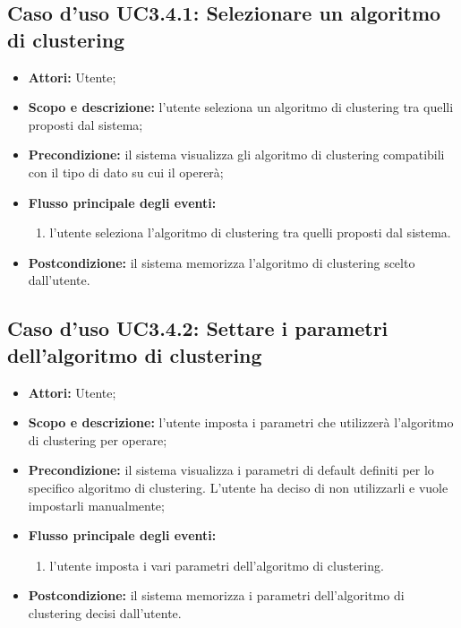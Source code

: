 \subsection{Caso d'uso UC3.4.1: Selezionare un algoritmo di clustering}
\begin{itemize}
\item \textbf{Attori:} Utente;
\item \textbf{Scopo e descrizione:} l'utente seleziona un algoritmo di clustering\glossario{} tra quelli proposti dal sistema;
\item \textbf{Precondizione:} il sistema visualizza gli algoritmo di clustering\glossario{} compatibili con il tipo di dato su cui il \protocol{} opererà;
\item \textbf{Flusso principale degli eventi:}
\begin{enumerate}
\item l'utente seleziona l'algoritmo di clustering\glossario{} tra quelli proposti dal sistema.
\end{enumerate}
\item \textbf{Postcondizione:} il sistema memorizza l'algoritmo di clustering\glossario{} scelto dall'utente.
\end{itemize}

\subsection{Caso d'uso UC3.4.2: Settare i parametri dell'algoritmo di clustering}
\begin{itemize}
\item \textbf{Attori:} Utente;
\item \textbf{Scopo e descrizione:} l'utente imposta i parametri che utilizzerà l'algoritmo di clustering\glossario{} per operare;
\item \textbf{Precondizione:} il sistema visualizza i parametri di default definiti per lo specifico algoritmo di clustering\glossario{}. L'utente ha deciso di non utilizzarli e vuole impostarli manualmente;
\item \textbf{Flusso principale degli eventi:}
\begin{enumerate}
\item l'utente imposta i vari parametri dell'algoritmo di clustering\glossario{}.
\end{enumerate}
\item \textbf{Postcondizione:} il sistema memorizza i parametri dell'algoritmo di clustering\glossario{} decisi dall'utente.
\end{itemize}

